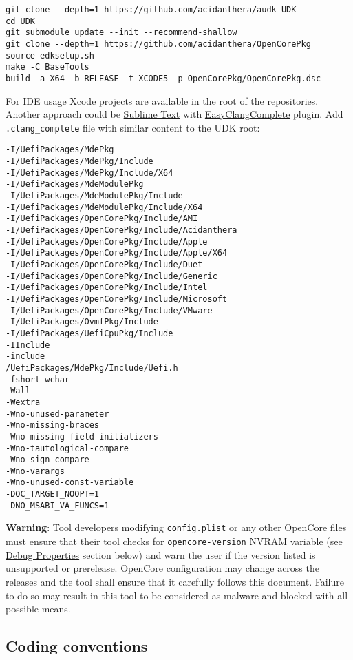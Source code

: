 \documentclass[]{article}
\begin{document}
\begin{lstlisting}[caption=Compilation Commands, label=compile, style=ocbash]
git clone --depth=1 https://github.com/acidanthera/audk UDK
cd UDK
git submodule update --init --recommend-shallow
git clone --depth=1 https://github.com/acidanthera/OpenCorePkg
source edksetup.sh
make -C BaseTools
build -a X64 -b RELEASE -t XCODE5 -p OpenCorePkg/OpenCorePkg.dsc
\end{lstlisting}

For IDE usage Xcode projects are available in the root of the repositories. Another
approach could be \href{https://www.sublimetext.com}{Sublime Text} with
\href{https://niosus.github.io/EasyClangComplete}{EasyClangComplete} plugin.
Add \texttt{.clang\_complete} file with similar content to the UDK root:

\begin{lstlisting}[caption=ECC Configuration, label=eccfile, style=ocbash]
-I/UefiPackages/MdePkg
-I/UefiPackages/MdePkg/Include
-I/UefiPackages/MdePkg/Include/X64
-I/UefiPackages/MdeModulePkg
-I/UefiPackages/MdeModulePkg/Include
-I/UefiPackages/MdeModulePkg/Include/X64
-I/UefiPackages/OpenCorePkg/Include/AMI
-I/UefiPackages/OpenCorePkg/Include/Acidanthera
-I/UefiPackages/OpenCorePkg/Include/Apple
-I/UefiPackages/OpenCorePkg/Include/Apple/X64
-I/UefiPackages/OpenCorePkg/Include/Duet
-I/UefiPackages/OpenCorePkg/Include/Generic
-I/UefiPackages/OpenCorePkg/Include/Intel
-I/UefiPackages/OpenCorePkg/Include/Microsoft
-I/UefiPackages/OpenCorePkg/Include/VMware
-I/UefiPackages/OvmfPkg/Include
-I/UefiPackages/UefiCpuPkg/Include
-IInclude
-include
/UefiPackages/MdePkg/Include/Uefi.h
-fshort-wchar
-Wall
-Wextra
-Wno-unused-parameter
-Wno-missing-braces
-Wno-missing-field-initializers
-Wno-tautological-compare
-Wno-sign-compare
-Wno-varargs
-Wno-unused-const-variable
-DOC_TARGET_NOOPT=1
-DNO_MSABI_VA_FUNCS=1
\end{lstlisting}

\textbf{Warning}: Tool developers modifying \texttt{config.plist} or any other OpenCore
files must ensure that their tool checks for \texttt{opencore-version} NVRAM variable
(see \hyperref[miscdebugprops]{Debug Properties} section below) and warn the user
if the version listed is unsupported or prerelease. OpenCore configuration may change
across the releases and the tool shall ensure that it carefully follows this document.
Failure to do so may result in this tool to be considered as malware and blocked with
all possible means.

\subsection{Coding conventions}\label{configuration-conv}
\end{document}
